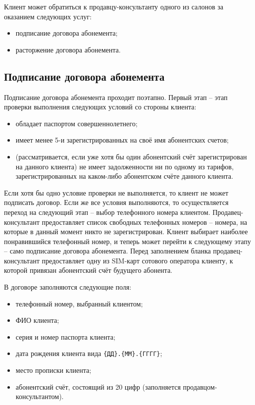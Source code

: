 Клиент может обратиться к продавцу-консультанту одного из салонов за оказанием следующих услуг:
\begin{itemize}
    \item подписание договора абонемента;
    \item расторжение договора абонемента.
\end{itemize}


\subsection{Подписание договора абонемента}


Подписание договора абонемента проходит поэтапно. Первый этап -- этап проверки выполнения следующих условий со стороны клиента:
\begin{itemize}
    \item обладает паспортом совершеннолетнего;
    \item имеет менее 5-и зарегистрированных на своё имя абонентских счетов;
    \item (рассматривается, если уже хотя бы один абонентский счёт зарегистрирован на данного клиента) не имеет задолженности ни по одному из тарифов, зарегистрированных на каком-либо абонентском счёте данного клиента.
\end{itemize}

Если хотя бы одно условие проверки не выполняется, то клиент не может подписать договор. Если же все условия выполняются, то осуществляется переход на следующий этап -- выбор телефонного номера клиентом. Продавец-консультант предоставляет список свободных телефонных номеров -- номера, на которые в данный момент никто не зарегистрирован. Клиент выбирает наиболее понравившийся телефонный номер, и теперь может перейти к следующему этапу -- само подписание договора абонемента. Перед заполнением бланка продавец-консультант предоставляет одну из SIM-карт сотового оператора клиенту, к которой привязан абонентский счёт будущего абонента.

В договоре заполняются следующие поля:
\begin{itemize}
    \item телефонный номер, выбранный клиентом;
    \item ФИО клиента;
    \item серия и номер паспорта клиента;
    \item дата рождения клиента вида \texttt{\{ДД\}.\{ММ\}.\{ГГГГ\}};
    \item место прописки клиента;
    \item абонентский счёт, состоящий из 20 цифр (заполняется продавцом-консультантом).
\end{itemize}

